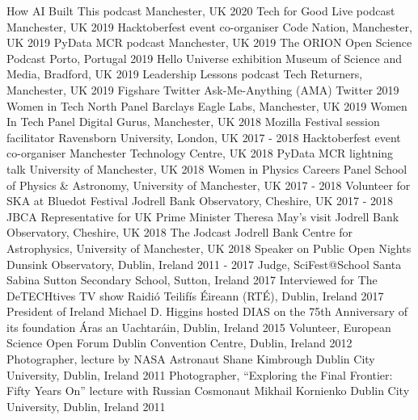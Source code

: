 \begin{cvpress}
   \cvpres
    {How AI Built This podcast}
    {Manchester, UK}
    {2020}
   \cvpres
    {Tech for Good Live podcast}
    {Manchester, UK}
    {2019}
   \cvpres
    {Hacktoberfest event co-organiser}
    {Code Nation, Manchester, UK}
    {2019}
   \cvpres
    {PyData MCR podcast}
    {Manchester, UK}
    {2019}
   \cvpres
    {The ORION Open Science Podcast}
    {Porto, Portugal}
    {2019}
   \cvpres
    {Hello Universe exhibition}
    {Museum of Science and Media, Bradford, UK}
    {2019}
   \cvpres
    {Leadership Lessons podcast}
    {Tech Returners, Manchester, UK}
    {2019}
   \cvpres
    {Figshare Twitter Ask-Me-Anything (AMA)}
    {Twitter}
    {2019}
   \cvpres
    {Women in Tech North Panel}
    {Barclays Eagle Labs, Manchester, UK}
    {2019}
   \cvpres
    {Women In Tech Panel}
    {Digital Gurus, Manchester, UK}
    {2018}
   \cvpres
   {Mozilla Festival session facilitator}
    {Ravensborn University, London, UK}
    {2017 - 2018}
   \cvpres
   {Hacktoberfest event co-organiser}
    {Manchester Technology Centre, UK}
    {2018}
   \cvpres
   {PyData MCR lightning talk}
    {University of Manchester, UK}
    {2018}
   \cvpres
   {Women in Physics Careers Panel}
    {School of Physics \& Astronomy, University of Manchester, UK}
    {2017 - 2018}
   \cvpres
   {Volunteer for SKA at Bluedot Festival}
    {Jodrell Bank Observatory, Cheshire, UK}
    {2017 - 2018}
   \cvpres
   {JBCA Representative for UK Prime Minister Theresa May's visit}
    {Jodrell Bank Observatory, Cheshire, UK}
    {2018}
   \cvpres
   {The Jodcast}
    {Jodrell Bank Centre for Astrophysics, University of Manchester, UK}
    {2018}
   \cvpres
   {Speaker on Public Open Nights}
    {Dunsink Observatory, Dublin, Ireland}
    {2011 - 2017}
   \cvpres
   {Judge, SciFest@School}
    {Santa Sabina Sutton Secondary School, Sutton, Ireland}
    {2017}
   \cvpres
   {Interviewed for The DeTECHtives TV show}
    {Raidi{\'o} Teilif{\'i}s {\'E}ireann (RT{\'E}), Dublin, Ireland}
    {2017}
   \cvpres
   {President of Ireland Michael D. Higgins hosted DIAS on the 75th Anniversary of its foundation}
    {{\'A}ras an Uachtar{\'a}in, Dublin, Ireland}
    {2015}
   \cvpres
   {Volunteer, European Science Open Forum}
    {Dublin Convention Centre, Dublin, Ireland}
    {2012}
   \cvpres
   {Photographer, lecture by NASA Astronaut Shane Kimbrough}
    {Dublin City University, Dublin, Ireland}
    {2011}
   \cvpres
   {Photographer, ``Exploring the Final Frontier: Fifty Years On'' lecture with Russian Cosmonaut Mikhail Kornienko}
    {Dublin City University, Dublin, Ireland}
    {2011}
\end{cvpress}


